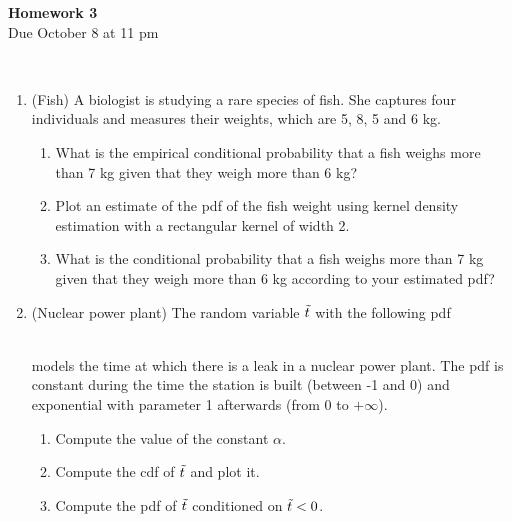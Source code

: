\documentclass[12pt,twoside]{article}
\begin{document}
\begin{center}
{\large{\textbf{Homework 3}} } \vspace{0.2cm}\\
Due October 8 at 11 pm
\\
\end{center}
\\

\begin{enumerate}

\item (Fish)
A biologist is studying a rare species of fish. She captures four individuals and measures their weights, which are 5, 8, 5 and 6 kg.
\begin{enumerate}
\item
What is the empirical conditional probability that a fish weighs more than 7 kg given that they weigh more than 6 kg? 
\item Plot an estimate of the pdf of the fish weight using kernel density estimation with a rectangular kernel of width 2.
\item What is the conditional probability that a fish weighs more than 7 kg given that they weigh more than 6 kg according to your estimated pdf?
\end{enumerate}

\item (Nuclear power plant)
The random variable $\tilde{  t }$ with the following pdf
\begin{figure}[h]
\begin{center}
\end{center}
\end{figure}\\
models the time at which there is a leak in a nuclear power plant. The pdf is constant during the time the station is built (between -1 and 0) and exponential with parameter 1 afterwards (from 0 to $+\infty$). 
\begin{enumerate}
\item Compute the value of the constant $\alpha$. 
\item Compute the cdf of $\tilde{  t }$ and plot it.
\item Compute the pdf of $\tilde{  t }$ conditioned on $\tilde{  t } <0$.
\end{enumerate}


\end{enumerate}
\end{document}
